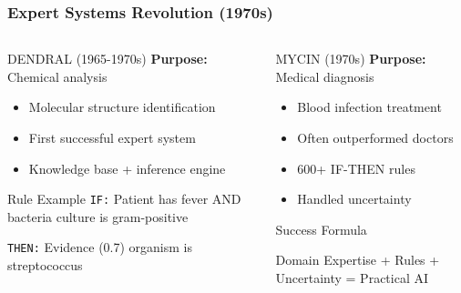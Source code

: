 \documentclass{beamer}
\begin{document}
\begin{frame}
    \frametitle{Expert Systems Revolution (1970s)}
    \begin{columns}
        \begin{column}{0.48\textwidth}
            \begin{block}{DENDRAL (1965-1970s)}
                \textbf{Purpose:} Chemical analysis
                \begin{itemize}
                    \item Molecular structure identification
                    \item First successful expert system
                    \item Knowledge base + inference engine
                \end{itemize}
            \end{block}
            
            \begin{exampleblock}{Rule Example}
                \texttt{IF:} Patient has fever AND bacteria culture is gram-positive
                
                \texttt{THEN:} Evidence (0.7) organism is streptococcus
            \end{exampleblock}
        \end{column}
        \begin{column}{0.48\textwidth}
            \begin{block}{MYCIN (1970s)}
                \textbf{Purpose:} Medical diagnosis
                \begin{itemize}
                    \item Blood infection treatment
                    \item Often outperformed doctors
                    \item 600+ IF-THEN rules
                    \item Handled uncertainty
                \end{itemize}
            \end{block}
            
            \begin{alertblock}{Success Formula}
                \begin{center}
                    Domain Expertise + Rules + Uncertainty = Practical AI
                \end{center}
            \end{alertblock}
        \end{column}
    \end{columns}
\end{frame}
\end{document}

